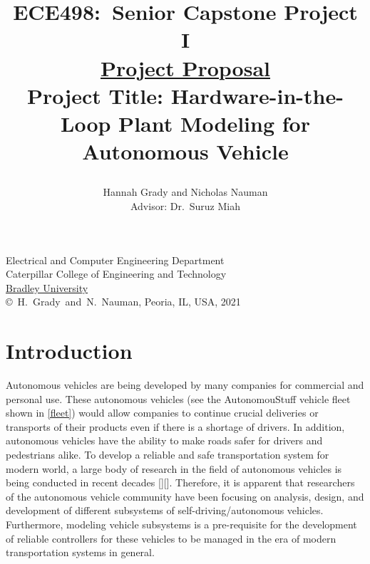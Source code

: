 \documentclass[letterpaper,12pt]{article}   %
\title{ECE498:~Senior Capstone Project I\\\textbf{\underline{Project Proposal}}\\
\vspace{0.5in}
Project Title: Hardware-in-the-Loop Plant Modeling for Autonomous Vehicle 
\vspace{1.0in}
\author{Hannah Grady and Nicholas Nauman\\ Advisor: Dr.~Suruz Miah}
}
\date{}  %
\begin{document}
\begin{titlepage}
  \maketitle

  \vspace*{4.0cm}
  \begin{center}
    \normalsize
    Electrical and Computer Engineering Department\\
    Caterpillar College of Engineering and Technology\\
\href{http://www.bradley.edu/}{Bradley University}\\

\vspace*{3.0cm}
\copyright~H.~Grady~and~N.~Nauman, Peoria, IL, USA, 2021\\

\end{center}
\thispagestyle{empty}

\end{titlepage} 
\newpage
\renewcommand{\contentsname}{Table of Contents}
\tableofcontents
\newpage

\section{Introduction}
Autonomous vehicles are being developed by many companies for commercial and
personal use. These autonomous vehicles (see the AutonomouStuff vehicle fleet
shown in \autoref{fleet}) would allow companies to continue crucial deliveries
or transports of their products even if there is a shortage of drivers. In
addition, autonomous vehicles have the ability to make roads safer for drivers
and pedestrians alike. To develop a reliable and safe transportation system for
modern world, a large body of research in the field of autonomous vehicles is
being conducted in recent decades [][].
Therefore, it is apparent that researchers of the autonomous vehicle community
have been focusing on analysis, design, and development of different subsystems
of self-driving/autonomous vehicles. Furthermore, modeling vehicle subsystems is
a pre-requisite for the development of reliable controllers for these vehicles
to be managed in the era of modern transportation systems in general.
\end{document}
